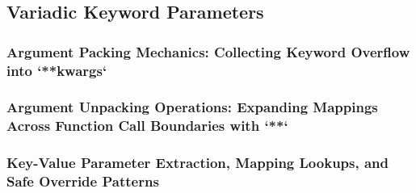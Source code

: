 \subsection{Variadic Keyword Parameters}
\subsubsection{Argument Packing Mechanics: Collecting Keyword Overflow into `**kwargs`}
\subsubsection{Argument Unpacking Operations: Expanding Mappings Across Function Call Boundaries with `**`}
\subsubsection{Key-Value Parameter Extraction, Mapping Lookups, and Safe Override Patterns}
